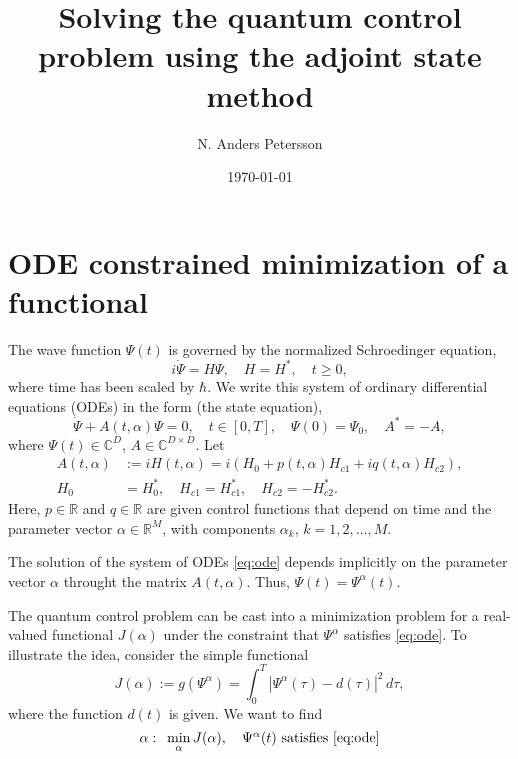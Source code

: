 \documentclass[11pt]{article}
\begin{document}
\title{Solving the quantum control problem using the adjoint state method}
\author{N. Anders Petersson}
\date{\today}
\maketitle

\section{ODE constrained minimization of a functional}
The wave function $\Psi(t)$ is governed by the normalized Schroedinger equation,
\[
i\dot{\Psi} = H\Psi,\quad H=H^*,\quad t\geq 0,
\]
where time has been scaled by $\hbar$.  We write this system of ordinary differential equations
(ODEs) in the form (the state equation),
\begin{equation}\label{eq:ode}
  \dot{\Psi} + A(t,\alpha)\Psi =0,\quad t\in[0,T], \quad \Psi(0) = \Psi_0,\quad A^* = -A,
\end{equation}
where $\Psi(t)\in {\mathbb C}^D$, $A\in {\mathbb C}^{D\times D} $. Let
\begin{align}
  A(t,\alpha) &:= iH(t,\alpha) = i\left(H_0 + p(t,\alpha)H_{c1} + i q(t,\alpha)H_{c2}\right),\\
  H_0&=H_0^*, \quad H_{c1} = H_{c1}^*, \quad H_{c2} = -H_{c2}^*.
\end{align}
Here, $p\in \mathbb{R}$ and $q\in \mathbb{R}$ are given control functions that depend on time and the
parameter vector $\alpha\in{\mathbb R}^M$, with components $\alpha_k$, $k=1,2,\ldots,M$.

The solution of the system of ODEs \eqref{eq:ode} depends implicitly on the parameter vector
$\alpha$ throught the matrix $A(t,\alpha)$. Thus, $\Psi(t)=\Psi^\alpha(t)$.

The quantum control problem can be cast into a minimization problem for a real-valued functional
$J(\alpha)$ under the constraint that $\Psi^\alpha$ satisfies \eqref{eq:ode}. To illustrate the idea,
consider the simple functional
\begin{equation}\label{eq_func-simple}
  J(\alpha) := g(\Psi^\alpha) = \int_0^T |\Psi^\alpha(\tau) - d(\tau)|^2\, d\tau,
\end{equation}
where the function $d(t)$ is given. We want to find
\[
\alpha:\enskip \min_\alpha  J(\alpha),\quad \mbox{$\Psi^\alpha(t)$ satisfies \eqref{eq:ode}} 
\]
\end{document}
